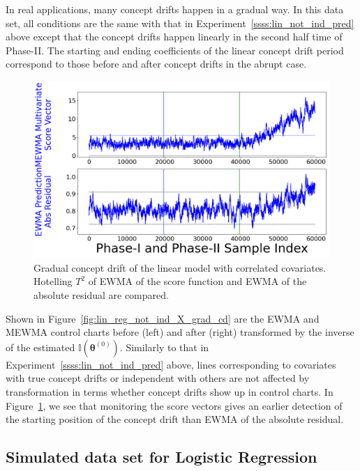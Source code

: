 \documentclass[twoside,11pt]{article}
\begin{document}
\begin{appendix}
In real applications, many concept drifts happen in a gradual way. In this data set, all conditions are the same with that in Experiment~\ref{ssss:lin_not_ind_pred} above except that the concept drifts happen linearly in the second half time of Phase-II. The starting and ending coefficients of the linear concept drift period correspond to those before and after concept drifts in the abrupt case. 
\begin{figure}[!htbp]
\centering
\includegraphics[width = 0.6\linewidth]{../figures/v14/sim_6/reg/1_sim6_lin_1e-08_0_005_1.png}
  \caption{Gradual concept drift of the linear model with correlated covariates. Hotelling $T^2$ of EWMA of the score function and EWMA of the absolute residual are compared.}
  \label{fig:lin_reg_ind_X_grad_cd_comp}
\end{figure}

Shown in Figure~\ref{fig:lin_reg_not_ind_X_grad_cd} are the EWMA and MEWMA control charts before (left) and after (right) transformed by {the inverse of the estimated} ${\mathbb {I}}(\bm { \theta}^{(0)})$. Similarly to that in Experiment~\ref{ssss:lin_not_ind_pred} above, lines corresponding to covariates with true concept drifts or independent with others are not affected by transformation in terms whether concept drifts show up in control charts. In Figure~\ref{fig:lin_reg_ind_X_grad_cd_comp}, we see that monitoring the score vectors gives an earlier detection of the starting position of the concept drift than EWMA of the absolute residual.

\subsection{Simulated data set for Logistic Regression}
\label{sss:logi_exp}



\end{appendix}
\end{document}
